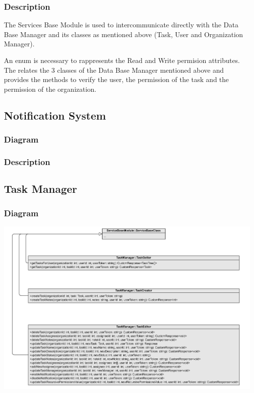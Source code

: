 \documentclass{article}
\begin{document}
\subsubsection{Description}

The Services Base Module is used to intercommunicate directly with the Data Base Manager and its classes as mentioned above (Task, User and Organization Manager).

An enum is necessary to rappresents the Read and Write permision attributes. The relates the 3 classes of the Data Base Manager mentioned above and provides the methods to verify the user, the permission of the task and the permission of the organization.

\subsection{Notification System}

\subsubsection{Diagram}

\subsubsection{Description}


\subsection{Task Manager} %
\subsubsection{Diagram}
\includegraphics[width=\textwidth, height=\textheight, keepaspectratio]{images/class_diagram/task_manager.jpg}
\end{document}
